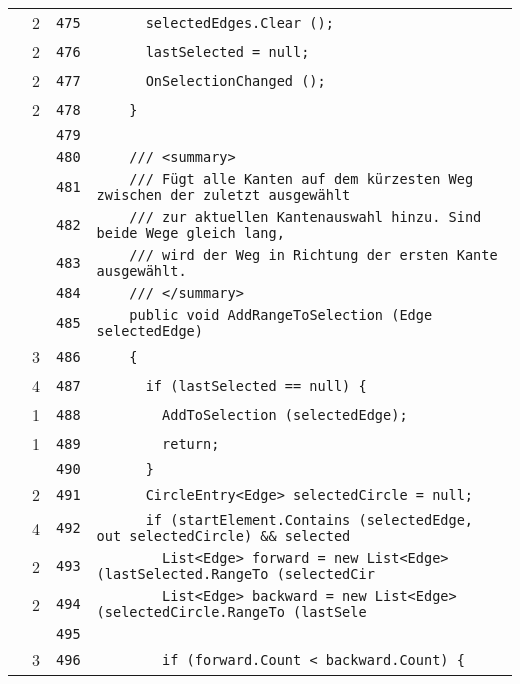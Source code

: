 \documentclass[a4paper,10pt]{article}
\begin{document}
\begin{longtable}[l]{lrrl}
\cellcolor{green} & 2 & \verb~475~ & \verb~      selectedEdges.Clear ();~\\
\cellcolor{green} & 2 & \verb~476~ & \verb~      lastSelected = null;~\\
\cellcolor{green} & 2 & \verb~477~ & \verb~      OnSelectionChanged ();~\\
\cellcolor{green} & 2 & \verb~478~ & \verb~    }~\\
\cellcolor{gray} &  & \verb~479~ & \verb~~\\
\cellcolor{gray} &  & \verb~480~ & \verb~    /// <summary>~\\
\cellcolor{gray} &  & \verb~481~ & \verb~    /// Fügt alle Kanten auf dem kürzesten Weg zwischen der zuletzt ausgewählt~\\
\cellcolor{gray} &  & \verb~482~ & \verb~    /// zur aktuellen Kantenauswahl hinzu. Sind beide Wege gleich lang,~\\
\cellcolor{gray} &  & \verb~483~ & \verb~    /// wird der Weg in Richtung der ersten Kante ausgewählt.~\\
\cellcolor{gray} &  & \verb~484~ & \verb~    /// </summary>~\\
\cellcolor{gray} &  & \verb~485~ & \verb~    public void AddRangeToSelection (Edge selectedEdge)~\\
\cellcolor{green} & 3 & \verb~486~ & \verb~    {~\\
\cellcolor{green} & 4 & \verb~487~ & \verb~      if (lastSelected == null) {~\\
\cellcolor{green} & 1 & \verb~488~ & \verb~        AddToSelection (selectedEdge);~\\
\cellcolor{green} & 1 & \verb~489~ & \verb~        return;~\\
\cellcolor{gray} &  & \verb~490~ & \verb~      }~\\
\cellcolor{green} & 2 & \verb~491~ & \verb~      CircleEntry<Edge> selectedCircle = null;~\\
\cellcolor{green} & 4 & \verb~492~ & \verb~      if (startElement.Contains (selectedEdge, out selectedCircle) && selected~\\
\cellcolor{green} & 2 & \verb~493~ & \verb~        List<Edge> forward = new List<Edge> (lastSelected.RangeTo (selectedCir~\\
\cellcolor{green} & 2 & \verb~494~ & \verb~        List<Edge> backward = new List<Edge> (selectedCircle.RangeTo (lastSele~\\
\cellcolor{gray} &  & \verb~495~ & \verb~~\\
\cellcolor{green} & 3 & \verb~496~ & \verb~        if (forward.Count < backward.Count) {~\\

\end{longtable}
\end{document}
